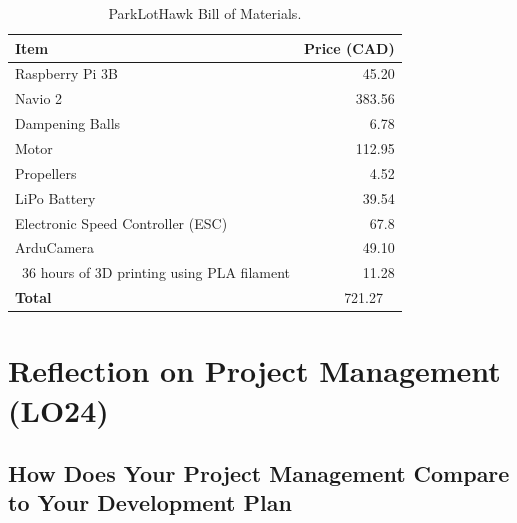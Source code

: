\documentclass{article}
\begin{document}
\begin{table}[ht]
\centering
\caption{ParkLotHawk Bill of Materials.}
\label{tab:parklothawk-bom}
\begin{tabular}{lr}
\textbf{Item} & \textbf{Price (CAD)} \\
\hline
Raspberry Pi 3B & 45.20\\
Navio 2 & 383.56\\
Dampening Balls & 6.78\\
Motor & 112.95 \\
Propellers & 4.52 \\
LiPo Battery & 39.54 \\
Electronic Speed Controller (ESC) & 67.8 \\
ArduCamera & 49.10 \\
~36 hours of 3D printing using PLA filament & 11.28 \\
\hline
\textbf{Total} & 721.27 \
\end{tabular}
\end{table}

\section{Reflection on Project Management (LO24)}


\subsection{How Does Your Project Management Compare to Your Development Plan}
\end{document}
